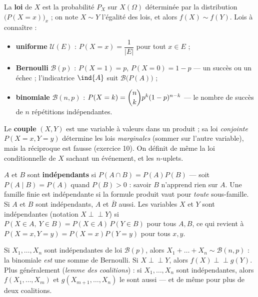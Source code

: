 
\begin{definition}
La \textbf{loi} de $X$ est la probabilité $P_X$ sur $X(\Omega)$ déterminée
par la distribution $\bigl(P(X=x)\bigr)_{x}$ ; on note $X\sim Y$ l'égalité
des lois, et alors $f(X)\sim f(Y)$. Lois à connaître :
\begin{itemize}[label={\color{otNavy}\textbullet},leftmargin=1.4em,itemsep=0.6mm,topsep=0.8mm]
  \item \textbf{uniforme} $\mathcal{U}(E)$ :
    $P(X=x)=\dfrac{1}{|E|}$ pour tout $x\in E$ ;
  \item \textbf{Bernoulli} $\mathcal{B}(p)$ :
    $P(X=1)=p$, $P(X=0)=1-p$ — un succès ou un échec ; l'indicatrice
    $\ind{A}$ suit $\mathcal{B}\bigl(P(A)\bigr)$ ;
  \item \textbf{binomiale} $\mathcal{B}(n,p)$ :
    $P(X=k)=\dbinom nk p^{k}(1-p)^{n-k}$ — le nombre de succès de $n$
    répétitions indépendantes.
\end{itemize}
Le \textbf{couple} $(X,Y)$ est une variable à valeurs dans un produit ; sa
loi \emph{conjointe} $P(X=x,Y=y)$ détermine les lois \emph{marginales}
(sommer sur l'autre variable), mais la réciproque est fausse
(exercice 10). On définit de même la loi conditionnelle de $X$ sachant un
événement, et les $n$-uplets.
\end{definition}


\begin{definition}
$A$ et $B$ sont \textbf{indépendants} si $P(A\cap B)=P(A)P(B)$ — soit
$P(A\mid B)=P(A)$ quand $P(B)>0$ : savoir $B$ n'apprend rien sur $A$. Une
famille finie est indépendante si la formule produit vaut pour
\emph{toute} sous-famille. Si $A$ et $B$ sont indépendants, $A$ et
$\overline B$ aussi. Les variables $X$ et $Y$ sont indépendantes
(notation $X\perp\!\!\!\perp Y$) si
$P(X\in A,\ Y\in B)=P(X\in A)\,P(Y\in B)$ pour tous $A,B$, ce qui revient
à $P(X=x,Y=y)=P(X=x)P(Y=y)$ pour tous $x,y$.
\end{definition}

\begin{theoreme}
Si $X_1,\dots,X_n$ sont indépendantes de loi $\mathcal{B}(p)$, alors
$X_1+\dots+X_n\sim\mathcal{B}(n,p)$ : la binomiale \emph{est} une somme de
Bernoulli. Si $X\perp\!\!\!\perp Y$, alors $f(X)\perp\!\!\!\perp g(Y)$.
Plus généralement (\emph{lemme des coalitions}) : si $X_1,\dots,X_n$ sont
indépendantes, alors $f(X_1,\dots,X_m)$ et $g(X_{m+1},\dots,X_n)$ le sont
aussi — et de même pour plus de deux coalitions.
\end{theoreme}

